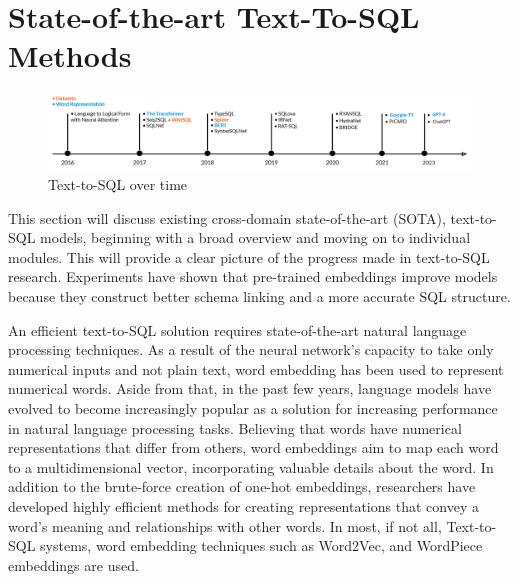 \section{State-of-the-art Text-To-SQL Methods}

\begin{figure}[htb]
  \centering
  \includegraphics[width=1\textwidth]{pics/Timeline.png}
  \caption{\small Text-to-SQL over time}
  \label{fig:timeline}
\end{figure}

This section will discuss existing cross-domain state-of-the-art (SOTA), text-to-SQL models, beginning with a broad overview and moving on to individual modules. This will provide a clear picture of the progress made in text-to-SQL research. Experiments have shown that pre-trained embeddings improve models because they construct better schema linking and a more accurate SQL structure.

An efficient text-to-SQL solution requires state-of-the-art natural language processing techniques.
As a result of the neural network's capacity to take only numerical inputs and not plain text, word embedding has been used to represent numerical words.
Aside from that, in the past few years, language models have evolved to become increasingly popular as a solution for increasing performance in natural language processing tasks.
Believing that words have numerical representations that differ from others, word embeddings aim to map each word to a multidimensional vector, incorporating valuable details about the word. In addition to the brute-force creation of one-hot embeddings, researchers have developed highly efficient methods for creating representations that convey a word's meaning and relationships with other words. In most, if not all, Text-to-SQL systems, word embedding techniques such as Word2Vec\cite{DBLP:journals/corr/Rong14}, and WordPiece embeddings\cite{DBLP:journals/corr/WuSCLNMKCGMKSJL16} are used.

